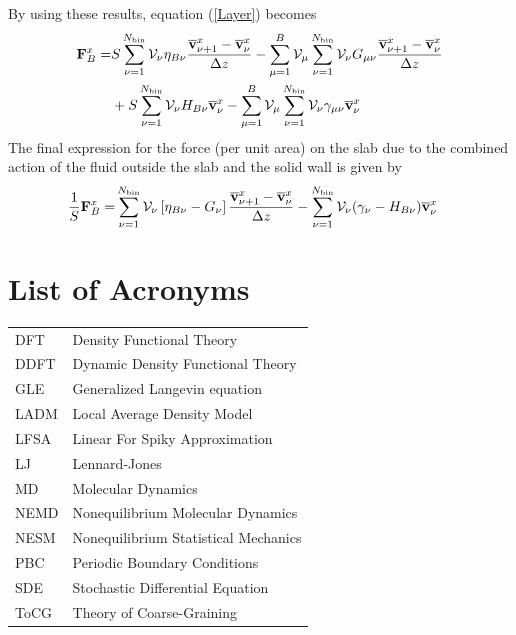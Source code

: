 \documentclass[b5paper,openright,10pt]{book}
\begin{document}
\begin{appendices}
By using these results, equation (\ref{Layer}) becomes
\begin{align}
{\bf F}^x_B=
& S\sum_{\nu=1}^{N_{\rm bin}} {\cal V}_\nu 
\eta_{B\nu}\frac{\overline{\bf v}^x_{\nu+1}-\overline{\bf v}^x_{\nu}}{\Delta z}
-\sum^{B}_{\mu=1}{\cal V}_\mu \sum_{\nu=1}^{N_{\rm bin}} {\cal V}_\nu G_{\mu\nu}
\frac{\overline{\bf v}^x_{\nu+1}-\overline{\bf v}^x_{\nu}}{\Delta z}
\nonumber \\
&+S\sum_{\nu=1}^{N_{\rm bin}} {\cal V}_\nu H_{B\nu}\overline{\bf v}^x_\nu 
-\sum^{B}_{\mu=1}{\cal V}_\mu \sum_{\nu=1}^{N_{\rm bin}} {\cal V}_\nu\gamma_{\mu\nu}\overline{\bf v}^x_\nu
\end{align}
The final expression for the force (per  unit area) on the slab due to
the combined action  of the fluid outside the slab  and the solid wall
is given by
\begin{align}
\frac{1}{S}{\bf F}^x_B=&  \sum_{\nu=1}^{N_{\rm bin}} {\cal V}_\nu 
\left[\eta_{B\nu}-G_\nu \right]\frac{\overline{\bf v}^x_{\nu+1}-\overline{\bf v}^x_{\nu}}{\Delta z}
-\sum_{\nu=1}^{N_{\rm bin}} {\cal V}_\nu(\gamma_{\nu}-H_{B\nu})\overline{\bf v}^x_\nu
\label{Layer2}
\end{align}

\chapter{List of Acronyms}\label{Ap:Acronyms}
\begin{tabular}{l l}
    DFT  & Density Functional Theory \\
    DDFT & Dynamic Density Functional Theory \\
    GLE  & Generalized Langevin equation \\
    LADM & Local Average Density Model \\
    LFSA & Linear For Spiky Approximation \\
    LJ   & Lennard-Jones \\
    MD   & Molecular Dynamics \\
    NEMD & Nonequilibrium Molecular Dynamics\\
    NESM & Nonequilibrium Statistical Mechanics \\
    PBC  & Periodic Boundary Conditions \\
    SDE  & Stochastic Differential Equation \\
    ToCG & Theory of Coarse-Graining \\
\end{tabular}



\end{appendices}
\end{document}
